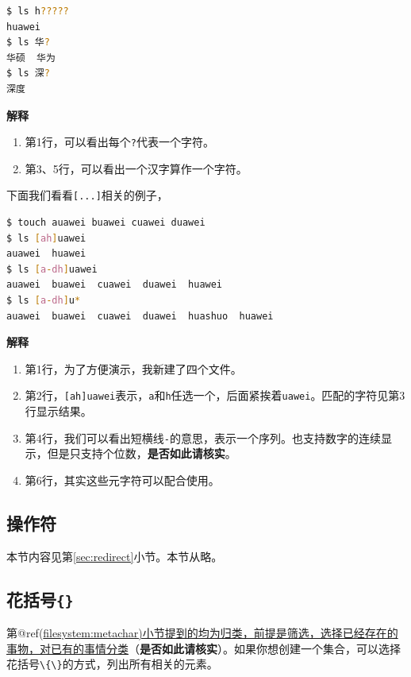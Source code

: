 \documentclass[doctor,openright,twoside]{sjtuthesis}
\providecommand{\tightlist}{%
    \setlength{\itemsep}{0pt}\setlength{\parskip}{0pt}}
\newcommand{\passthrough}[1]{#1}
\theoremstyle{plain}
\theoremstyle{definition}
\theoremstyle{remark}
\theoremstyle{ocrenumbox}
\theoremstyle{plain}
\begin{document}
\begin{lstlisting}[language=bash]
$ ls h?????
huawei
$ ls 华?
华硕  华为
$ ls 深?
深度
\end{lstlisting}

\textbf{解释}

\begin{enumerate}
\def\labelenumi{\arabic{enumi}.}
\tightlist
\item
  第1行，可以看出每个\passthrough{\lstinline!?!}代表一个字符。
\item
  第3、5行，可以看出一个汉字算作一个字符。
\end{enumerate}

下面我们看看\passthrough{\lstinline![...]!}相关的例子，

\begin{lstlisting}[language=bash]
$ touch auawei buawei cuawei duawei
$ ls [ah]uawei
auawei  huawei
$ ls [a-dh]uawei
auawei  buawei  cuawei  duawei  huawei
$ ls [a-dh]u*
auawei  buawei  cuawei  duawei  huashuo  huawei
\end{lstlisting}

\textbf{解释}

\begin{enumerate}
\def\labelenumi{\arabic{enumi}.}
\tightlist
\item
  第1行，为了方便演示，我新建了四个文件。
\item
  第2行，\passthrough{\lstinline![ah]uawei!}表示，\passthrough{\lstinline!a!}和\passthrough{\lstinline!h!}任选一个，后面紧挨着\passthrough{\lstinline!uawei!}。匹配的字符见第3行显示结果。
\item
  第4行，我们可以看出短横线\passthrough{\lstinline!-!}的意思，表示一个序列。也支持数字的连续显示，但是只支持个位数，\textbf{是否如此请核实}。
\item
  第6行，其实这些元字符可以配合使用。
\end{enumerate}

\subsection{操作符}

本节内容见第\ref{sec:redirect}小节。本节从略。

\subsection{\texorpdfstring{花括号\texttt{\{\}}}{花括号\{\}}}

第@ref(\url{filesystem:metachar)小节提到的均为归类，前提是筛选，选择已经存在的事物，对已有的事情分类}（\textbf{是否如此请核实}）。如果你想创建一个集合，可以选择花括号\passthrough{\lstinline!\{\}!}的方式，列出所有相关的元素。
\end{document}

